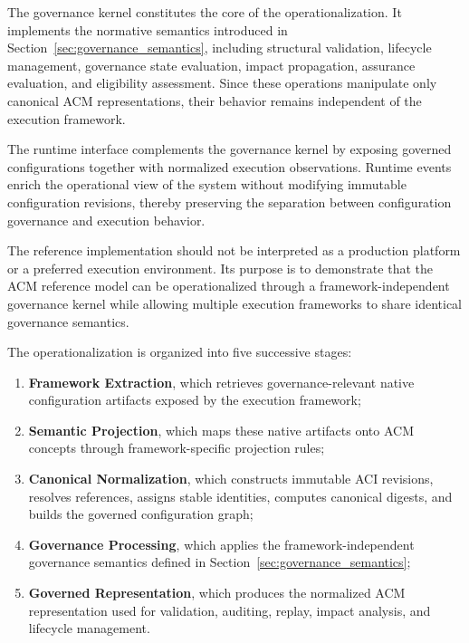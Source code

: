\documentclass[10pt]{article}
\begin{document}
The governance kernel constitutes the core of the operationalization. It implements the normative semantics introduced in Section~\ref{sec:governance_semantics}, including structural validation, lifecycle management, governance state evaluation, impact propagation, assurance evaluation, and eligibility assessment. Since these operations manipulate only canonical ACM representations, their behavior remains independent of the execution framework.

The runtime interface complements the governance kernel by exposing governed configurations together with normalized execution observations. Runtime events enrich the operational view of the system without modifying immutable configuration revisions, thereby preserving the separation between configuration governance and execution behavior.

The reference implementation should not be interpreted as a production platform or a preferred execution environment. Its purpose is to demonstrate that the ACM reference model can be operationalized through a framework-independent governance kernel while allowing multiple execution frameworks to share identical governance semantics.

The operationalization is organized into five successive stages:

\begin{enumerate}
	\item \textbf{Framework Extraction}, which retrieves governance-relevant native configuration artifacts exposed by the execution framework;
	
	\item \textbf{Semantic Projection}, which maps these native artifacts onto ACM concepts through framework-specific projection rules;
	
	\item \textbf{Canonical Normalization}, which constructs immutable ACI revisions, resolves references, assigns stable identities, computes canonical digests, and builds the governed configuration graph;
	
	\item \textbf{Governance Processing}, which applies the framework-independent governance semantics defined in Section~\ref{sec:governance_semantics};
	
	\item \textbf{Governed Representation}, which produces the normalized ACM representation used for validation, auditing, replay, impact analysis, and lifecycle management.
\end{enumerate}
\end{document}
